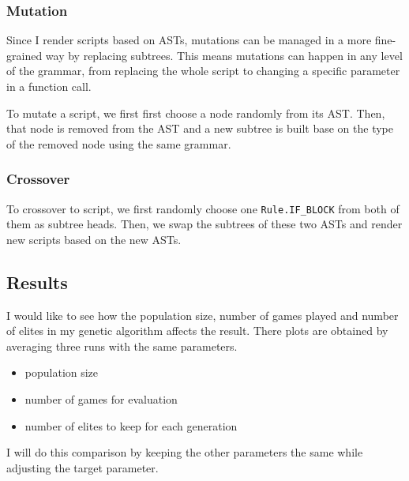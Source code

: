 \documentclass[]{article}
\providecommand{\tightlist}{%
  \setlength{\itemsep}{0pt}\setlength{\parskip}{0pt}}
\begin{document}
\subsubsection{Mutation}\label{mutation}

Since I render scripts based on ASTs, mutations can be managed in a more
fine-grained way by replacing subtrees. This means mutations can happen
in any level of the grammar, from replacing the whole script to changing
a specific parameter in a function call.

To mutate a script, we first first choose a node randomly from its AST.
Then, that node is removed from the AST and a new subtree is built base
on the type of the removed node using the same grammar.

\subsubsection{Crossover}\label{crossover}

To crossover to script, we first randomly choose one
\texttt{Rule.IF\_BLOCK} from both of them as subtree heads. Then, we
swap the subtrees of these two ASTs and render new scripts based on the
new ASTs.

\subsection{Results}\label{results}

I would like to see how the population size, number of games played and number of elites in my genetic algorithm affects
the result. There plots are obtained by averaging three runs with the same parameters.

\begin{itemize}
\tightlist
\item
  population size
\item
  number of games for evaluation
\item
  number of elites to keep for each generation
\end{itemize}

I will do this comparison by keeping the other parameters the same while
adjusting the target parameter.
\end{document}
